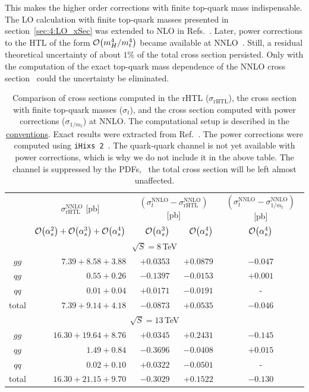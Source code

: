 This makes the higher order corrections with finite top-quark mass indispensable. The \acs{LO} calculation with finite top-quark masses presented in section~\ref{sec:4:LO_xSec} was extended to \acs{NLO} in Refs.~\cite{Djouadi:1991tka, Graudenz:1992pv}. Later, power corrections to the \acs{HTL} of the form $\mathcal{O}\!\left(m_H^4/m_t^4\right)$ became available at \acs{NNLO}~\cite{Harlander:2009mq, Harlander:2009my, Pak:2009dg}. Still, a residual theoretical uncertainty of about $1\%$ of the total cross section persisted. Only with the computation of the exact top-quark mass dependence of the \acs{NNLO} cross section~\cite{Czakon:2021yub} could the uncertainty be eliminated.
\begin{table}[t!]

\centering
\begin{tabular}{c|r|rr|c}
\hline
\rule{0pt}{1em}
\multirow{2}{*}{channel} & \multicolumn{1}{c|}{$\sigma^\mathrm{NNLO}_\mathrm{rHTL}$ [pb]} &
\multicolumn{2}{c|}{$(\sigma^\mathrm{NNLO}_t-
\sigma^\mathrm{NNLO}_\mathrm{rHTL})$ [pb]} &
$(\sigma^\mathrm{NNLO}_t- \sigma^\mathrm{NNLO}_{1/m_t})$ [pb] \\
& $\mathcal{O}\!\left(\alpha_s^2\right)+\mathcal{O}\!\left(\alpha_s^3\right)+\mathcal{O}\!\left(\alpha_s^4\right)$ & \multicolumn{1}{r}{$\mathcal{O}\!\left(\alpha_s^3\right)$} & \multicolumn{1}{r|}{$\mathcal{O}\!\left(\alpha_s^4\right)$} & $\mathcal{O}\!\left(\alpha_s^4\right)$ \\
\hline
\multicolumn{5}{c}{\rule{0pt}{1em}$\sqrt{S} = 8$\,TeV}\\\hline
$gg$ & $7.39 + 8.58 + 3.88$ &  $+0.0353$ & $+0.0879$ & $-0.047$ \\
$qg$ & $0.55 + 0.26$ & $-0.1397$ & $-0.0153$ & $+0.001 $\\
$qq$ & $0.01 + 0.04$ & $+0.0171$ & $-0.0191$ & - \\\hline
total & $7.39 + 9.14 + 4.18$ &  $-0.0873$ & $+0.0535$ & $-0.046$ \\
\hline
\multicolumn{5}{c}{\rule{0pt}{1em}$\sqrt{S} = 13$\,TeV}\\\hline
$gg$ & $16.30 + 19.64 + 8.76$ & $+0.0345$ & $+0.2431$ & $-0.145$ \\
$qg$ & $1.49 + 0.84$ & $-0.3696$ & $-0.0408$ & $+0.015$ \\
$qq$ & $0.02 + 0.10$ & $+0.0322$ & $-0.0501$ & - \\\hline
total & $16.30 + 21.15 + 9.70$ & $-0.3029$ & $+0.1522$ & $-0.130$ \\
\hline
\end{tabular}
\caption{Comparison of cross sections computed in the \acs{rHTL} ($\sigma_\mathrm{rHTL}$), the cross section with finite top-quark masses ($\sigma_{t}$), and the cross section computed with power corrections ($\sigma_{1/m_t}$) at \acs{NNLO}. The computational setup is described in the \hyperref[chap:notation_and_conventions]{conventions}. Exact results were extracted from Ref.~\cite{Czakon:2021yub}. The power corrections were computed using \texttt{iHixs 2}~\cite{Dulat:2018rbf}. The quark-quark channel is not yet available with power corrections, which is why we do not include it in the above table. The channel is suppressed by the \acs{PDF}s, \ie\ the total cross section will be left almost unaffected.} \label{tab:4:finite_top_quark_mass_effects}
\end{table}

